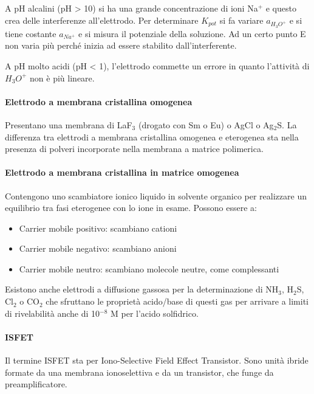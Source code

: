 
A pH alcalini (pH > 10) si ha una grande concentrazione di ioni Na$^+$ e questo crea delle interferenze all'elettrodo.
Per determinare $K_{pot}$ si fa variare $a_{H_3O^+}$ e si tiene costante $a_{Na^+}$ e si misura il potenziale della soluzione.
Ad un certo punto E non varia più perché inizia ad essere stabilito dall'interferente.


A pH molto acidi (pH < 1), l'elettrodo commette un errore in quanto l'attività di $H_3O^+$ non è più lineare.

\paragraph{Elettrodo a membrana cristallina omogenea}
Presentano una membrana di LaF$_3$ (drogato con Sm o Eu) o AgCl o Ag$_2$S.
La differenza tra elettrodi a membrana cristallina omogenea e eterogenea sta nella presenza di polveri incorporate nella membrana a matrice polimerica.


\paragraph{Elettrodo a membrana cristallina in matrice omogenea}
Contengono uno scambiatore ionico liquido in solvente organico per realizzare un equilibrio tra fasi eterogenee con lo ione in esame.
Possono essere a:
\begin{itemize}
\item Carrier mobile positivo: scambiano cationi
\item Carrier mobile negativo: scambiano anioni 
\item Carrier mobile neutro: scambiano molecole neutre, come complessanti
\end{itemize}


Esistono anche elettrodi a diffusione gassosa per la determinazione di NH$_3$, H$_2$S, Cl$_2$ o CO$_2$ che sfruttano le proprietà acido/base di questi gas per arrivare a limiti di rivelabilità anche di 10$^{-8}$ M per l'acido solfidrico.

\paragraph{ISFET}
Il termine ISFET sta per Iono-Selective Field Effect Transistor.
Sono unità ibride formate da una membrana ionoselettiva e da un transistor, che funge da preamplificatore.

